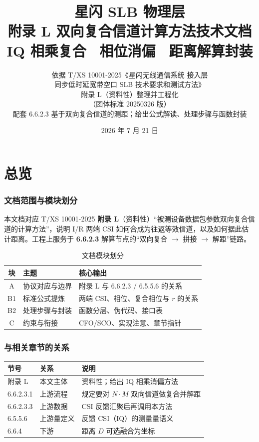 \documentclass[11pt,a4paper]{ctexart}
\title{%
  \textbf{星闪 SLB 物理层}\\[0.4em]
  \Large 附录 L 双向复合信道计算方法技术文档\\[0.3em]
  \large IQ 相乘复合 \textbullet\ 相位消偏 \textbullet\ 距离解算封装
}
\author{依据 T/XS 10001-2025《星闪无线通信系统 接入层\\
同步低时延宽带空口 SLB 技术要求和测试方法》\\
附录 L（资料性）整理并工程化\\
（团体标准 20250326 版）\\[0.3em]
\small 配套 6.6.2.3 基于双向复合信道的测距；给出公式解读、处理步骤与函数封装}
\date{2026 年 7 月 21 日}
\begin{document}
\maketitle
\tableofcontents
\newpage

\part{总览}

\section{文档范围与模块划分}

本文档对应 T/XS 10001-2025 \textbf{附录 L}（资料性）``被测设备数据包参数双向复合信道的计算方法''，说明 I/R 两端 CSI 如何合成为往返等效信道，以及如何据此估计距离。工程上服务于 \textbf{6.6.2.3} 解算节点的``双向复合 $\rightarrow$ 拼接 $\rightarrow$ 解距''链路。

\begin{table}[h]
\centering
\small
\caption{文档模块划分}
\begin{tabular}{clp{8cm}}
\toprule
\textbf{块} & \textbf{主题} & \textbf{核心输出} \\
\midrule
A & 协议对应与边界 & 附录 L 与 6.6.2.3 / 6.5.5.6 的关系 \\
B1 & 标准公式提炼 & 两端 CSI、相位、复合相位与 $r$ 的关系 \\
B2 & 处理步骤与封装 & 函数分层、伪代码、接口表 \\
C & 约束与衔接 & CFO/SCO、实现注意、章节指针 \\
\bottomrule
\end{tabular}
\end{table}

\section{与相关章节的关系}

\begin{table}[h]
\centering
\small
\begin{tabular}{lll}
\toprule
\textbf{节号} & \textbf{关系} & \textbf{说明} \\
\midrule
附录 L & 本文主体 & 资料性；给出 IQ 相乘消偏方法 \\
6.6.2.3.1 & 上游流程 & 规定要对 $N\cdot M$ 双向信道做复合并解距 \\
6.6.2.3.3 & 上游数据 & CSI 反馈汇聚后再调用本方法 \\
6.5.5.6 & 上游量定义 & 反馈 CSI（IQ）的测量量语义 \\
6.6.4 & 下游 & 距离 $D$ 可选融合为坐标 \\
\bottomrule
\end{tabular}
\end{table}
\end{document}
